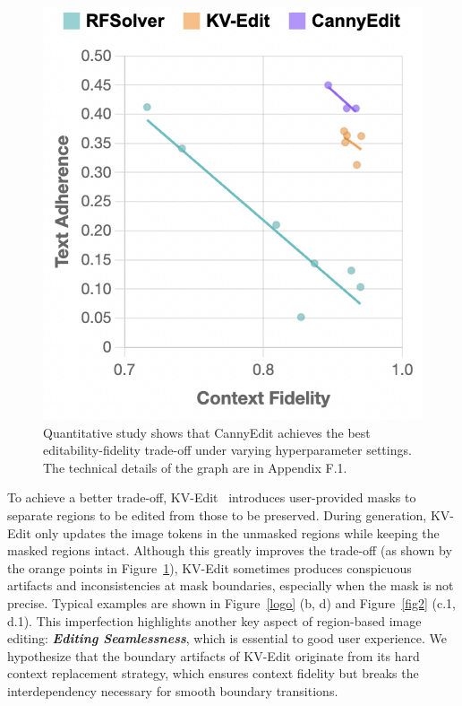 \documentclass{article}
\begin{document}
\begin{figure}
  \vspace{-12pt} %
    \includegraphics[width=1\linewidth]{figures/tl4.png}
    \vspace{-6mm}
    \caption{Quantitative study shows that CannyEdit achieves the best editability-fidelity trade-off under varying hyperparameter settings. The technical details of the graph are in Appendix F.1.}
    \label{treadline}
      \vspace{-9pt} %
\end{figure}

To achieve a better trade-off, KV-Edit~\citep{zhu2025kv} introduces user-provided masks to separate regions to be edited from those to be preserved.
During generation, KV-Edit only updates the image tokens in the unmasked regions while keeping the masked regions intact.
Although this greatly improves the trade-off (as shown by the orange points in Figure~\ref{treadline}), KV-Edit sometimes produces conspicuous artifacts and inconsistencies at mask boundaries, especially when the mask is not precise.
Typical examples are shown in Figure~\ref{logo} (b, d) and Figure~\ref{fig2} (c.1, d.1).
This imperfection highlights another key aspect of region-based image editing: \textbf{\textit{Editing Seamlessness}}, which is essential to good user experience.
We hypothesize that the boundary artifacts of KV-Edit originate from its hard context replacement strategy, which ensures context fidelity but breaks the interdependency necessary for smooth boundary transitions.
\end{document}
